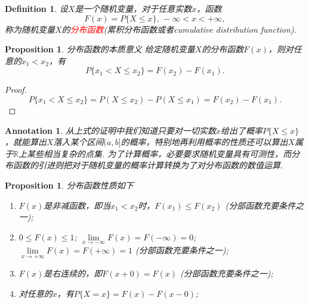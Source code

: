 \documentclass{article}
\newtheorem{proposition}[theorem]{Proposition}
\newtheorem{definition}[theorem]{Definition}
\newtheorem{annotation}[theorem]{Annotation}
\newcommand{\redt}[1]{\textcolor{red}{#1}}
\begin{document}
\begin{definition}
\rm 设$X$是一个随机变量，对于任意实数$x$，函数
$$
F(x) = P\{X \leq x\},\,-\infty < x < +\infty,
$$
称为随机变量$X$的\redt{分布函数}(累积分布函数或者cumulative distribution function). 
\end{definition}

\begin{proposition}
\rm {\color{red} 分布函数的本质意义} 给定随机变量$X$的分布函数$F(x)$，则对任意的$x_1 < x_2$，有
$$
P\{x_1 < X \leq x_2\} = F(x_2) - F(x_1).
$$
\end{proposition}

\begin{proof}
$$
P\{x_1 < X \leq x_2\} = P(X \leq x_2) - P(X \leq x_1) = F(x_2)-F(x_1).
$$
\end{proof}

\begin{annotation}
\rm {\color{blue}从上式的证明中我们知道只要对一切实数$x$给出了概率$P\{X \leq x\}$，就能算出$X$落入某个区间$(a,b]$的概率，特别地再利用概率的性质还可以算出$X$属于$\mathbb{R}$上某些相当复杂的点集}. 为了计算概率，必要要求随机变量具有可测性，而分布函数的引进则把对于随机变量的概率计算转换为了对分布函数的数值运算. 
\end{annotation}

\begin{proposition}
\rm 分布函数性质如下
\begin{enumerate}
	\item $F(x)$是非减函数，即当$x_1 < x_2$时，$F(x_1) \leq F(x_2)$ ({\color{red}分部函数充要条件之一});
	\item $0 \leq F(x) \leq 1$; $\lim\limits_{x \rightarrow -\infty}F(x) =F(-\infty) = 0$; $\lim\limits_{x \rightarrow +\infty}F(x) =F(+\infty)= 1$ ({\color{red}分部函数充要条件之一});
	\item $F(x)$是右连续的，即$F(x+0) = F(x)$ ({\color{red}分部函数充要条件之一}); 
	\item 对任意的$x$，有$P\{X = x\} = F(x) - F(x-0)$;  
\end{enumerate}
\end{proposition}
\end{document}
